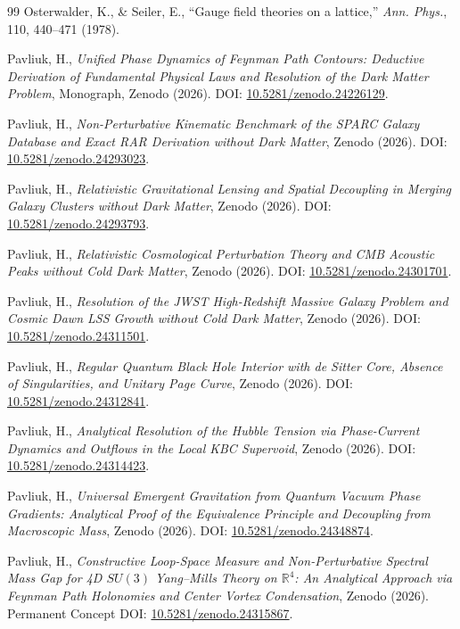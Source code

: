 \documentclass[11pt, a4paper]{article}
\theoremstyle{definition}
\theoremstyle{remark}
\begin{document}
\begin{thebibliography}{99}
Osterwalder, K., \& Seiler, E., ``Gauge field theories on a lattice,'' \textit{Ann. Phys.}, 110, 440--471 (1978).

Pavliuk, H., \textit{Unified Phase Dynamics of Feynman Path Contours: Deductive Derivation of Fundamental Physical Laws and Resolution of the Dark Matter Problem}, Monograph, Zenodo (2026). DOI: \href{https://doi.org/10.5281/zenodo.24226129}{10.5281/zenodo.24226129}.

Pavliuk, H., \textit{Non-Perturbative Kinematic Benchmark of the SPARC Galaxy Database and Exact RAR Derivation without Dark Matter}, Zenodo (2026). DOI: \href{https://doi.org/10.5281/zenodo.24293023}{10.5281/zenodo.24293023}.

Pavliuk, H., \textit{Relativistic Gravitational Lensing and Spatial Decoupling in Merging Galaxy Clusters without Dark Matter}, Zenodo (2026). DOI: \href{https://doi.org/10.5281/zenodo.24293793}{10.5281/zenodo.24293793}.

Pavliuk, H., \textit{Relativistic Cosmological Perturbation Theory and CMB Acoustic Peaks without Cold Dark Matter}, Zenodo (2026). DOI: \href{https://doi.org/10.5281/zenodo.24301701}{10.5281/zenodo.24301701}.

Pavliuk, H., \textit{Resolution of the JWST High-Redshift Massive Galaxy Problem and Cosmic Dawn LSS Growth without Cold Dark Matter}, Zenodo (2026). DOI: \href{https://doi.org/10.5281/zenodo.24311501}{10.5281/zenodo.24311501}.

Pavliuk, H., \textit{Regular Quantum Black Hole Interior with de Sitter Core, Absence of Singularities, and Unitary Page Curve}, Zenodo (2026). DOI: \href{https://doi.org/10.5281/zenodo.24312841}{10.5281/zenodo.24312841}.

Pavliuk, H., \textit{Analytical Resolution of the Hubble Tension via Phase-Current Dynamics and Outflows in the Local KBC Supervoid}, Zenodo (2026). DOI: \href{https://doi.org/10.5281/zenodo.24314423}{10.5281/zenodo.24314423}.

Pavliuk, H., \textit{Universal Emergent Gravitation from Quantum Vacuum Phase Gradients: Analytical Proof of the Equivalence Principle and Decoupling from Macroscopic Mass}, Zenodo (2026). DOI: \href{https://doi.org/10.5281/zenodo.24348874}{10.5281/zenodo.24348874}.

Pavliuk, H., \textit{Constructive Loop-Space Measure and Non-Perturbative Spectral Mass Gap for 4D $SU(3)$ Yang--Mills Theory on $\mathbb{R}^{4}$: An Analytical Approach via Feynman Path Holonomies and Center Vortex Condensation}, Zenodo (2026). Permanent Concept DOI: \href{https://doi.org/10.5281/zenodo.24315867}{10.5281/zenodo.24315867}.


\end{thebibliography}
\end{document}
